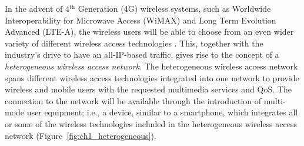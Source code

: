 In the advent of 4$^{\text{th}}$ Generation (4G) wireless systems, such as Worldwide Interoperability for Microwave Access (WiMAX) and Long Term Evolution Advanced (LTE-A), the wireless users will be able to choose from an even wider variety of different wireless access technologies \cite{HossainBeaubrun09, HossainTalebiFard09}. This, together with the industry's drive to have an all-IP-based traffic, gives rise to the concept of a \emph{heterogeneous wireless access network}. The heterogeneous wireless access network spans different wireless access technologies integrated into one network to provide wireless and mobile users with the requested multimedia services and QoS. The connection to the network will be available through the introduction of multi-mode user equipment; i.e., a device, similar to a smartphone, which integrates all or some of the wireless technologies included in the heterogeneous wireless access network (Figure~\ref{fig:ch1_heterogeneous}).

